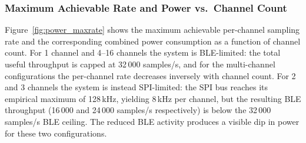 \subsubsection*{Maximum Achievable Rate and Power vs.\ Channel Count}

Figure~\ref{fig:power_maxrate} shows the maximum achievable per-channel sampling
rate and the corresponding combined power consumption as a function of channel
count. For 1 channel and 4--16 channels the system is BLE-limited: the total useful
throughput is capped at 32\,000 samples/s, and for the multi-channel configurations
the per-channel rate decreases inversely with channel count. For 2 and 3 channels the system is instead SPI-limited: the SPI
bus reaches its empirical maximum of 128\,kHz, yielding 8\,kHz per channel, but
the resulting BLE throughput (16\,000 and 24\,000 samples/s respectively) is
below the 32\,000\,samples/s BLE ceiling. The reduced BLE activity produces a
visible dip in power for these two configurations.

